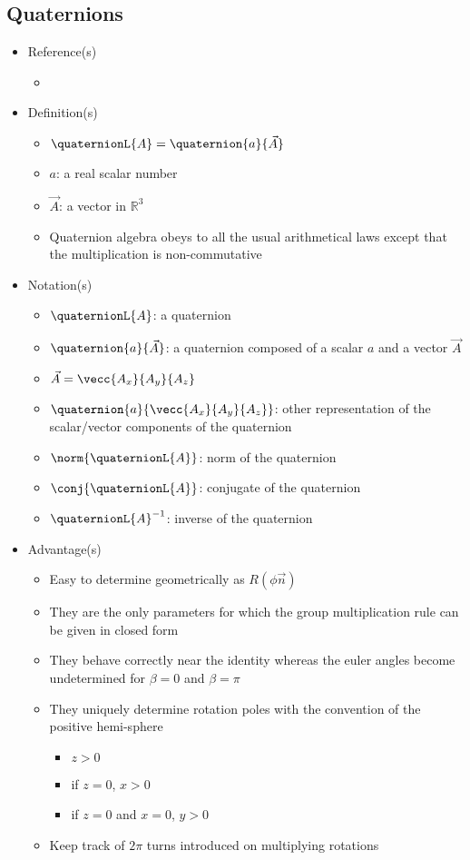 \documentclass[letterpaper]{article}
\begin{document}
	\subsection{Quaternions}
	\begin{itemize}
		\item Reference(s)
			\begin{itemize}
				\item \cite{Altmann1986}
			\end{itemize}
		\item Definition(s)
			\begin{itemize}
				\item $\quaternionL{A} = \quaternion{a}{\vec{A}}$
				\item $a$: a real scalar number
				\item $\vec{A}$: a vector in $\mathbb{R}^3$
				\item Quaternion algebra obeys to all the usual arithmetical laws except that the multiplication is non-commutative
			\end{itemize}
		\item Notation(s)
			\begin{itemize}
				\item $\quaternionL{A}$: a quaternion
				\item $\quaternion{a}{\vec{A}}$: a quaternion composed of a scalar $a$ and a vector $\vec{A}$
				\item $\vec{A} = \vecc{A_x}{A_y}{A_z}$
				\item $\quaternion{a}{\vecc{A_x}{A_y}{A_z}}$: other representation of the scalar/vector components of the quaternion
				\item $\norm{\quaternionL{A}}$: norm of the quaternion
				\item $\conj{\quaternionL{A}}$: conjugate of the quaternion
				\item $\quaternionL{A}^{-1}$: inverse of the quaternion
			\end{itemize}
		\item Advantage(s)
			\begin{itemize}
				\item Easy to determine geometrically as $R\left(\phi\vec{n}\right)$
				\item They are the only parameters for which the group multiplication rule can be given in closed form
				\item They behave correctly near the identity whereas the euler angles become undetermined for $\beta=0$ and $\beta=\pi$
				\item They uniquely determine rotation poles with the convention of the positive hemi-sphere
					\begin{itemize}
						\item $z>0$
						\item if $z=0$, $x>0$
						\item if $z=0$ and $x=0$, $y>0$
					\end{itemize}
				\item Keep track of $2\pi$ turns introduced on multiplying rotations
			\end{itemize}
	\end{itemize}
	
\end{document}
